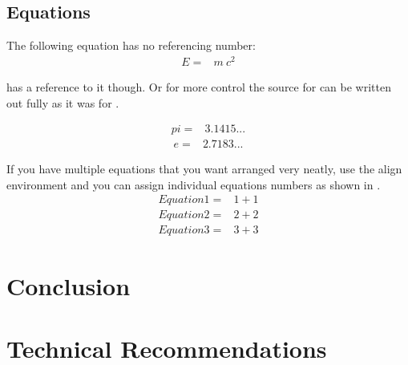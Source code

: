 \documentclass[12pt, letterpaper]{article}
\newcommand{\nonumeq}[1]{\begin{align*}#1\end{align*}}
\newcommand{\numeq}[2]{\begin{align}\label{#2}#1\end{align}}
\begin{document}
			\clearpage %
		
		
		\subsection{Equations}
			The following equation has no referencing number:
			\nonumeq{E = & m\ c^2}

			 has a reference to it though. Or for more control the source for  can be written out fully as it was for .

			\numeq{pi = & 3.1415...}{eq:quickEq} %
			\begin{align}\label{eq:quickEq2}
				e = & 2.7183...
			\end{align}

			If you have multiple equations that you want arranged very neatly, use the align environment and you can assign individual equations numbers as shown in .
			\begin{align}%
				\label{eq:multiref:a} Equation1 = & 1 + 1\\
				\label{eq:multiref:b} Equation2 = & 2 + 2\\
				\label{eq:multiref:c} Equation3 = & 3 + 3
			\end{align}
		
	\section{Conclusion}\hspace{2.6ex}
		\label{}
		\lipsum[87-89] %
	
	\section{Technical Recommendations}\hspace{2.6ex}
		\label{}
		\lipsum[100] %
	\newpage
        
\end{document}
